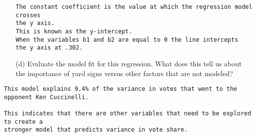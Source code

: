 \documentclass[12pt,letterpaper]{article}
\begin{document}
\begin{enumerate}
\begin{verbatim}
The constant coefficient is the value at which the regression model crosses 
the y axis. 
This is known as the y-intercept. 
When the variables b1 and b2 are equal to 0 the line intercepts
the y axis at .302.

 \end{verbatim}
	
	\item [(d)] Evaluate the model fit for this regression.  What does this	tell us about the importance of yard signs versus other factors that are not modeled?
	
\end{enumerate}  

\begin{verbatim}
This model explains 9.4% of the variance in votes that went to the opponent Ken Cuccinelli. 

This indicates that there are other variables that need to be explored to create a 
stronger model that predicts variance in vote share. 

\end{verbatim}
\end{document}

